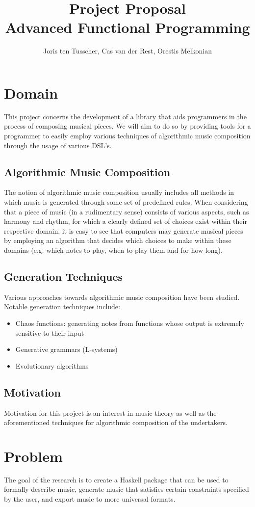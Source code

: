 \documentclass[12pt,a4paper]{article}
\title{\textbf{Project Proposal \\ \small{Advanced Functional Programming}}}
\author{\small{Joris ten Tusscher, Cas van der Rest, Orestis Melkonian}}
\date{}
\begin{document}
\maketitle

\section{Domain}
This project concerns the development of a library that aids programmers in the process of composing musical pieces. We will aim to do so by providing tools for a programmer to easily employ various techniques of algorithmic music composition through the usage of various DSL's. 
\subsection{Algorithmic Music Composition}
The notion of algorithmic music composition usually includes all methods in which music is generated through some set of predefined rules. When considering that a piece of music (in a rudimentary sense) consists of various aspects, such as harmony and rhythm, for which a clearly defined set of choices exist within their respective domain, it is easy to see that computers may generate musical pieces by employing an algorithm that decides which choices to make within these domains (e.g. which notes to play, when to play them and for how long).

\subsection{Generation Techniques}
Various approaches towards algorithmic music composition have been studied. Notable generation techniques include: 
\begin{itemize}
\item 
Chaos functions: generating notes from functions whose output is extremely sensitive to their input
\item
Generative grammars (L-systems)
\item
Evolutionary algorithms
\end{itemize}
\subsection{Motivation}
Motivation for this project is an interest in music theory as well as the aforementioned techniques for algorithmic composition of the undertakers. 

\section{Problem}
The goal of the research is to create a Haskell package that can be used to formally describe music, generate music that satisfies certain constraints specified by the user, and export music to more universal formats.
\end{document}
